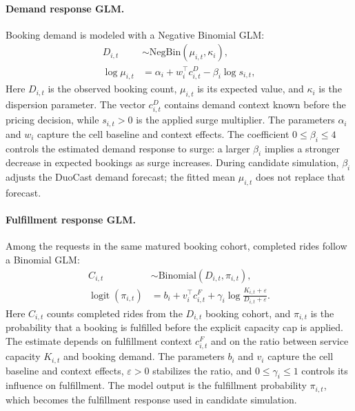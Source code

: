 \documentclass[a4paper,10pt,twocolumn]{article}
\newcommand{\logit}{\operatorname{logit}}
\begin{document}
\paragraph{Demand response GLM.}
Booking demand is modeled with a Negative Binomial GLM:
\begin{equation}
\begin{aligned}
 D_{i,t}&\sim\mathrm{NegBin}(\mu_{i,t},\kappa_i),\\
 \log\mu_{i,t}&=\alpha_i+w_i^{\top}c^D_{i,t}
                   -\beta_i\log s_{i,t},
\end{aligned}
\label{eq:nb}
\end{equation}
Here $D_{i,t}$ is the observed booking count, $\mu_{i,t}$ is its expected
value, and $\kappa_i$ is the dispersion parameter. The vector $c^D_{i,t}$
contains demand context known before the pricing decision, while $s_{i,t}>0$
is the applied surge multiplier. The parameters $\alpha_i$ and $w_i$ capture the
cell baseline and context effects. The coefficient $0\le\beta_i\le4$
controls the estimated demand response to surge: a larger $\beta_i$ implies
a stronger decrease in expected bookings as surge increases. During candidate
simulation, $\beta_i$ adjusts the DuoCast demand forecast; the fitted mean
$\mu_{i,t}$ does not replace that forecast.

\paragraph{Fulfillment response GLM.}
Among the requests in the same matured booking cohort, completed rides follow
a Binomial GLM:
\begin{equation}
\begin{aligned}
 C_{i,t}&\sim\mathrm{Binomial}(D_{i,t},\pi_{i,t}),\\
 \logit(\pi_{i,t})&=b_i+v_i^{\top}c^F_{i,t}
  +\gamma_i\log\frac{K_{i,t}+\varepsilon}{D_{i,t}+\varepsilon}.
\end{aligned}
\label{eq:binomial}
\end{equation}
Here $C_{i,t}$ counts completed rides from the $D_{i,t}$ booking cohort, and
$\pi_{i,t}$ is the probability that a booking is fulfilled before the explicit
capacity cap is applied. The estimate depends on fulfillment context
$c^F_{i,t}$ and on the ratio between service capacity $K_{i,t}$ and booking
demand. The parameters $b_i$ and $v_i$ capture the cell baseline and context effects,
$\varepsilon>0$ stabilizes the ratio, and $0\le\gamma_i\le1$ controls its
influence on fulfillment. The model output is the fulfillment probability
$\pi_{i,t}$, which becomes the fulfillment response used in candidate
simulation.
\end{document}
